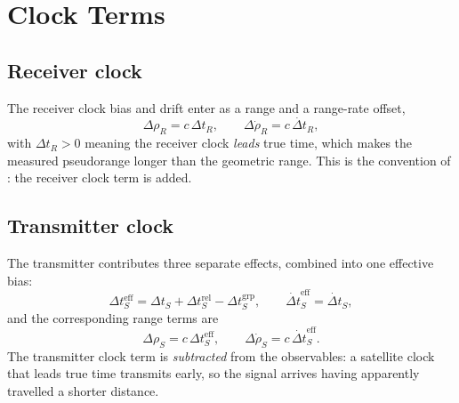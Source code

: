 \section{Clock Terms}
\label{sec:gnss-clocks}

\subsection{Receiver clock}

The receiver clock bias and drift enter as a range and a range-rate offset,
\begin{equation}
  \label{eq:gnss-rx-clock}
  \Delta\rho_R = c\,\Delta t_R, \qquad
  \Delta\dot\rho_R = c\,\dot{\Delta t}_R ,
\end{equation}
with $\Delta t_R > 0$ meaning the receiver clock \emph{leads} true time, which
makes the measured pseudorange longer than the geometric range. This is the
convention of \citet{misra2011gnss}: the receiver clock term is added.

\subsection{Transmitter clock}

The transmitter contributes three separate effects, combined into one
effective bias:
\begin{equation}
  \label{eq:gnss-tx-clock}
  \Delta t_S^{\mathrm{eff}}
  = \Delta t_S + \Delta t_S^{\mathrm{rel}} - \Delta t_S^{\mathrm{grp}} ,
  \qquad
  \dot{\Delta t}_S^{\mathrm{eff}} = \dot{\Delta t}_S ,
\end{equation}
and the corresponding range terms are
\begin{equation}
  \label{eq:gnss-tx-clock-range}
  \Delta\rho_S = c\,\Delta t_S^{\mathrm{eff}}, \qquad
  \Delta\dot\rho_S = c\,\dot{\Delta t}_S^{\mathrm{eff}} .
\end{equation}
The transmitter clock term is \emph{subtracted} from the observables: a
satellite clock that leads true time transmits early, so the signal arrives
having apparently travelled a shorter distance.

